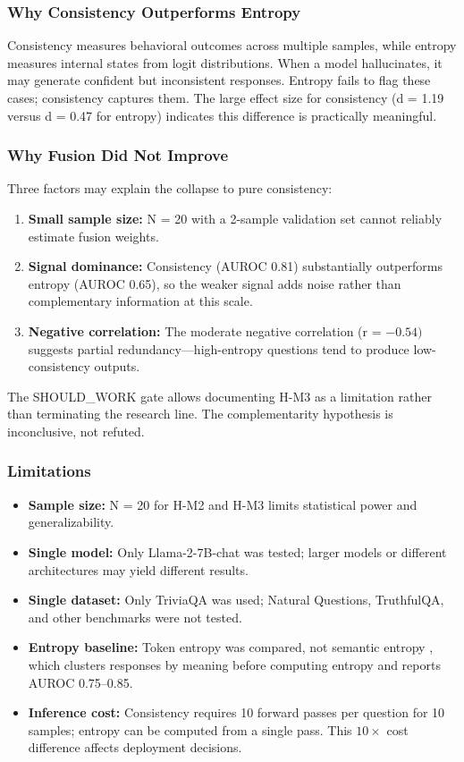 
\subsubsection{Why Consistency Outperforms Entropy}

Consistency measures behavioral outcomes across multiple samples, while entropy measures internal states from logit distributions. When a model hallucinates, it may generate confident but inconsistent responses. Entropy fails to flag these cases; consistency captures them. The large effect size for consistency (d = 1.19 versus d = 0.47 for entropy) indicates this difference is practically meaningful.

\subsubsection{Why Fusion Did Not Improve}

Three factors may explain the collapse to pure consistency:

\begin{enumerate}
\item \textbf{Small sample size:} N = 20 with a 2-sample validation set cannot reliably estimate fusion weights.
\item \textbf{Signal dominance:} Consistency (AUROC 0.81) substantially outperforms entropy (AUROC 0.65), so the weaker signal adds noise rather than complementary information at this scale.
\item \textbf{Negative correlation:} The moderate negative correlation (r = $-0.54)$ suggests partial redundancy---high-entropy questions tend to produce low-consistency outputs.
\end{enumerate}

The SHOULD\_WORK gate allows documenting H-M3 as a limitation rather than terminating the research line. The complementarity hypothesis is inconclusive, not refuted.

\subsubsection{Limitations}

\begin{itemize}
\item \textbf{Sample size:} N = 20 for H-M2 and H-M3 limits statistical power and generalizability.
\item \textbf{Single model:} Only Llama-2-7B-chat was tested; larger models or different architectures may yield different results.
\item \textbf{Single dataset:} Only TriviaQA was used; Natural Questions, TruthfulQA, and other benchmarks were not tested.
\item \textbf{Entropy baseline:} Token entropy was compared, not semantic entropy \citep{kuhn2023semantic}, which clusters responses by meaning before computing entropy and reports AUROC 0.75--0.85.
\item \textbf{Inference cost:} Consistency requires 10 forward passes per question for 10 samples; entropy can be computed from a single pass. This $10\times$ cost difference affects deployment decisions.
\end{itemize}


